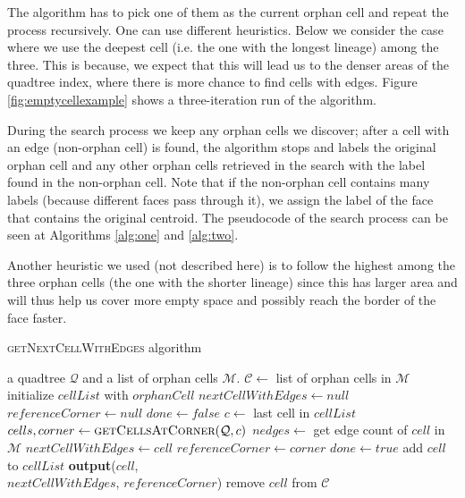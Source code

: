 The algorithm has to pick one of them as the current orphan cell and repeat the process recursively. One can use different heuristics. 
Below we consider the case where we use the deepest cell (i.e. the one with the longest lineage) among the three. This is because, we expect that this will lead us to the denser areas of the quadtree index, where there is more chance to find cells with edges.
Figure \ref{fig:emptycellexample} shows a three-iteration run of the algorithm.

During the search process we keep any orphan cells we discover; after a cell with an edge (non-orphan cell) is found, the algorithm stops and labels the original orphan cell and any other orphan cells retrieved in the search with the label found in the non-orphan cell.
Note that if the non-orphan cell contains many labels (because different faces pass through it), we assign the label of the face that contains the original centroid.
The pseudocode of the search process can be seen at Algorithms \ref{alg:one} and \ref{alg:two}.  

Another heuristic we used (not described here) is to follow the highest among the three orphan cells (the one with the shorter lineage) since this has larger area and will thus help us cover more empty space and possibly reach the border of the face faster.

\begin{algorithm}
    \ssp
    \small
    \caption{\textsc{getNextCellWithEdges} algorithm}\label{alg:one}
    \begin{algorithmic}[1]
    \Require a quadtree $\mathcal Q$ and a list of orphan cells $\mathcal M$.
        \State $\mathcal C \gets $ list of orphan cells in $\mathcal M$
            \State initialize $cellList$ with $orphanCell$
            \State $nextCellWithEdges \gets null$
            \State $referenceCorner \gets null$
            \State $done \gets false$
                \State $c \gets $ last cell in $cellList$
                \State $cells, corner \gets \textsc{getCellsAtCorner}(\mathcal Q, c)$
                    \State $nedges \gets$ get edge count of $cell$ in $\mathcal M$
                        \State $nextCellWithEdges \gets cell$
                        \State $referenceCorner \gets corner$
                        \State $done \gets true$
                    \Else
                        \State add $cell$ to $cellList$
                    \EndIf
                \EndFor
            \EndWhile
                \State \textbf{output}($cell$, \\
                \hspace{2.5cm} $nextCellWithEdges$, $referenceCorner$)
                \State remove $cell$ from $\mathcal C$
            \EndFor
        \EndFor
    \EndFunction
    \end{algorithmic}
\end{algorithm}

